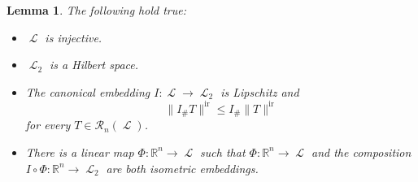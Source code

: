 \documentclass[reqno]{amsart}
\newtheorem{lemma}[theorem]{Lemma}
\numberwithin{equation}{section}
\newcommand{\R}{\mathbb{R}}
\newcommand{\norm}[1]{\lVert#1\rVert}
\DeclareMathOperator{\Ell}{\mathscr{L}}
\DeclareMathOperator{\ir}{ir}
\begin{document}
\begin{lemma}
\label{lem:proof-of-main-thm}
The following hold true:
\begin{itemize}
    \item[(1)] $\Ell$ is injective. 
    \item[(2)] $\Ell_2$ is a Hilbert space.
    \item[(3)] The canonical embedding $I\colon \Ell \to \Ell_2$ is Lipschitz and
\begin{equation}\label{eq:volume-non-increasing}
\norm{I_\# T}^{\ir} \leq I_\# \norm{T}^{\ir}
\end{equation}
for every $T\in \mathcal{R}_n(\Ell)$.
\item[(4)] There is a linear map $\Phi \colon \mathbb{R}^n\to \Ell$ such that $\Phi \colon \mathbb{R}^n\to \Ell$ and the composition $I\circ \Phi \colon \R^n \to \Ell_2$ are both isometric embeddings.
\end{itemize}
\end{lemma}
\end{document}
